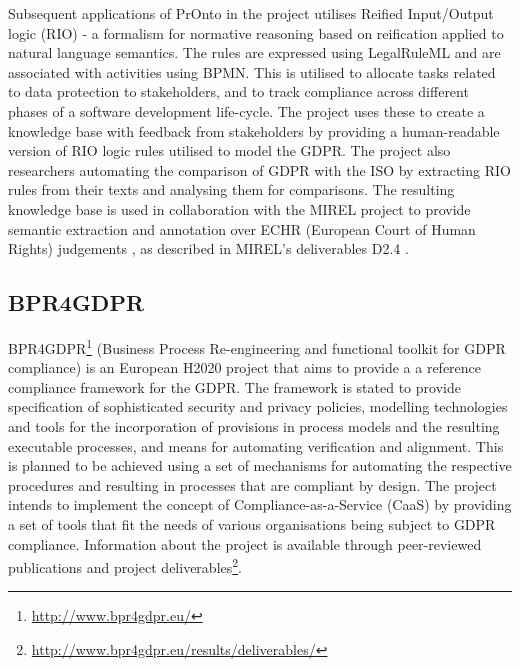 Subsequent applications of PrOnto in the project utilises Reified Input/Output logic (RIO) \cite{robaldo_reified_2017} - a formalism for normative reasoning based on reification applied to natural language semantics. The rules are expressed using LegalRuleML and are associated with activities using BPMN. This is utilised to allocate tasks related to data protection to stakeholders, and to track compliance across different phases of a software development life-cycle.
The project uses these to create a knowledge base \cite{bartolini_agile_2019} with feedback from stakeholders by providing a human-readable version of RIO logic rules utilised to model the GDPR. 
The project also researchers automating the comparison of GDPR with the ISO by extracting RIO rules from their texts and analysing them for comparisons.
The resulting knowledge base is used in collaboration with the MIREL project to provide semantic extraction and annotation over ECHR (European Court of Human Rights) judgements \cite{cardellino_legal_2017}, as described in MIREL's deliverables D2.4 \cite{robaldo_livio_d2.4_2017}.

\subsection{BPR4GDPR}
BPR4GDPR\footnote{\url{http://www.bpr4gdpr.eu/}} (Business Process Re-engineering and functional toolkit for GDPR compliance) is an European H2020 project that aims to provide a a reference compliance framework for the GDPR. The framework is stated to provide specification of sophisticated security and privacy policies, modelling technologies and tools for the incorporation of provisions in process models and the resulting executable processes, and means for automating verification and alignment.
This is planned to be achieved using a set of mechanisms for automating the respective procedures and resulting in processes that are compliant by design.
The project intends to implement the concept of Compliance-as-a-Service (CaaS) by providing a set of tools that fit the needs of various organisations being subject to GDPR compliance.
Information about the project is available through peer-reviewed publications and project deliverables\footnote{\url{http://www.bpr4gdpr.eu/results/deliverables/}}.

